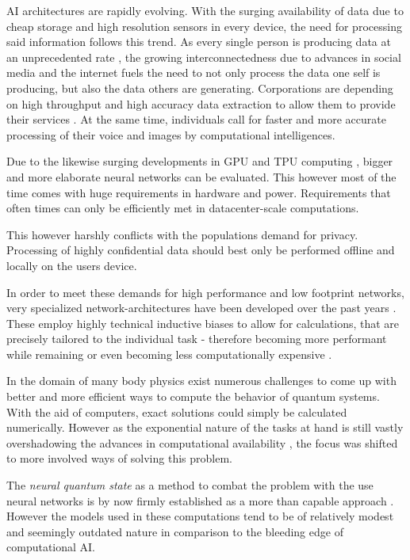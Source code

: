 AI architectures are rapidly evolving. With the surging availability of data due to cheap storage \cite[]{costDataStorage} and high resolution sensors in every device, the need for processing said information follows this trend.
As every single person is producing data at an unprecedented rate \cite[]{dataCreatedRate}, the growing interconnectedness due to advances in social media and the internet fuels the need to not only process the data one self is producing, but also the data others are generating.
Corporations are depending on high throughput and high accuracy data extraction to allow them to provide their services \cite{marketsizeArtificialIntelligence}.
At the same time, individuals call for faster and more accurate processing of their voice and images by computational intelligences. 

Due to the likewise surging developments in GPU and TPU computing \cite{gpuPerformanceOverTime}, bigger and more elaborate neural networks can be evaluated.
This however most of the time comes with huge requirements in hardware and power. 
Requirements that often times can only be efficiently met in datacenter-scale computations.

This however harshly conflicts with the populations demand for privacy. 
Processing of highly confidential data should best only be performed offline and locally on the users device.

In order to meet these demands for high performance and low footprint networks, very specialized network-architectures have been developed over the past years \cite[]{attentionIsAllYouNeed, metaformerPaper}. 
These employ highly technical inductive biases to allow for calculations, that are precisely tailored to the individual task - therefore becoming more performant while remaining or even becoming less computationally expensive \cite{mobileNetPaper}.

In the domain of many body physics exist numerous challenges to come up with better and more efficient ways to compute the behavior of quantum systems.
With the aid of computers, exact solutions could \glqq simply\grqq{} be calculated numerically.
However as the exponential nature of the tasks at hand is still vastly overshadowing the advances in computational availability \cite{quantumMonteCarloSimulationsOfSolids}, the focus was shifted to more involved ways of solving this problem.

The \emph{neural quantum state} as a method to combat the problem with the use neural networks is by now firmly established as a more than capable approach \cite{quantumMBPwithneuralNetworks}. However the models used in these computations tend to be of relatively modest and seemingly \glqq outdated\grqq{} nature in comparison to the bleeding edge of computational AI.

